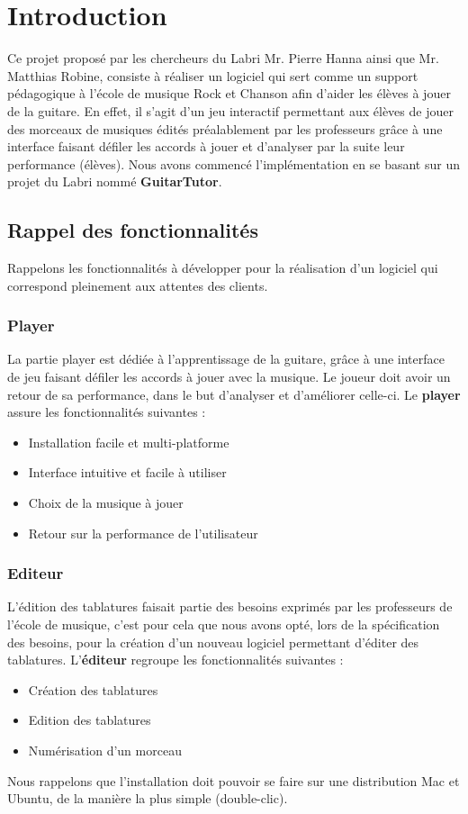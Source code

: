 \chapter{Introduction}
Ce projet proposé par les chercheurs du Labri Mr. Pierre Hanna ainsi que Mr. Matthias Robine, consiste à réaliser un logiciel qui sert comme un support pédagogique à l'école de musique Rock et Chanson afin d'aider les élèves à jouer de la guitare. En effet, il s'agit d'un jeu interactif permettant aux élèves de jouer des morceaux de musiques édités préalablement par les professeurs grâce à une interface faisant défiler les accords à jouer et d'analyser par la suite leur performance (élèves). Nous avons commencé l'implémentation en se basant sur un projet du Labri nommé \textbf{GuitarTutor}.

\section{Rappel des fonctionnalités}
Rappelons les fonctionnalités à développer pour la réalisation d'un logiciel qui correspond pleinement aux attentes des clients.\\

\subsection{Player}
La partie player est dédiée à l’apprentissage de la guitare, grâce à une interface de jeu faisant déﬁler les accords à jouer avec la musique. Le joueur doit
avoir un retour de sa performance, dans le but d’analyser et d’améliorer celle-ci. Le \textbf{player} assure les fonctionnalités suivantes :
\begin{itemize}
\item Installation facile et multi-platforme
\item Interface intuitive et facile à utiliser
\item Choix de la musique à jouer
\item Retour sur la performance de l'utilisateur
\end{itemize}

\subsection{Editeur}
L’édition des tablatures faisait partie des besoins exprimés par les professeurs de l’école de musique, c'est pour cela que nous avons opté, lors de la spécification des besoins, pour la création d’un nouveau logiciel permettant d'éditer des tablatures. L'\textbf{éditeur} regroupe les fonctionnalités suivantes :
\begin{itemize}
\item Création des tablatures 
\item Edition des tablatures
\item Numérisation d'un morceau
\end{itemize}

Nous rappelons que l'installation doit pouvoir se faire sur une distribution Mac et Ubuntu, de la manière la plus simple (double-clic).
